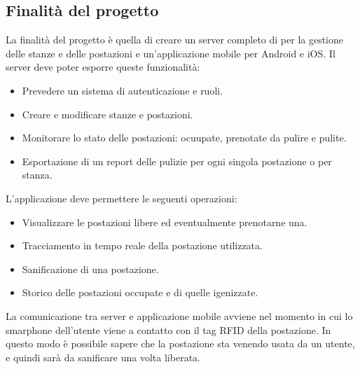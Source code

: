\subsection{Finalità del progetto}
La finalità del progetto è quella di creare un server completo di  per la gestione delle stanze e delle postazioni e un'applicazione mobile per Android e iOS.
Il server deve poter esporre queste funzionalità:
\begin{itemize}
    \item Prevedere un sistema di autenticazione e ruoli.
    \item Creare e modificare stanze e postazioni.
    \item Monitorare lo stato delle postazioni: ocuupate, prenotate da pulire e pulite.
    \item Esportazione di un report delle pulizie per ogni singola postazione o per stanza.
\end{itemize}
L'applicazione deve permettere le seguenti operazioni:
\begin{itemize}
    \item Visualizzare le postazioni libere ed eventualmente prenotarne una.
    \item Tracciamento in tempo reale della postazione utilizzata.
    \item Sanificazione di una postazione.
    \item Storico delle postazioni occupate e di quelle igenizzate.
\end{itemize}
La comunicazione tra server e applicazione mobile avviene nel momento in cui lo smarphone dell'utente viene a contatto con il tag RFID della postazione.
In questo modo è possibile sapere che la postazione sta venendo usata da un utente, e quindi sarà da sanificare una volta liberata.


